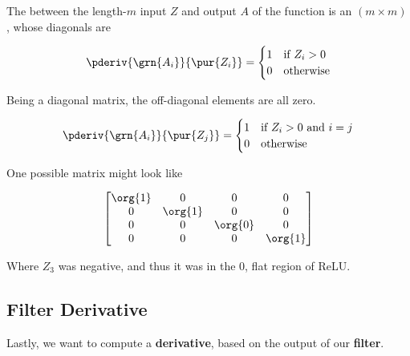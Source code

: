         \begin{kequation}
            The  between the length-$m$ input $Z$ and output $A$ of the  function is an $(m \times m)$ , whose diagonals are

            \begin{equation*}
                \pderiv { \grn{A_i} }{ \pur{Z_i} } = \begin{cases}
                    1 & \text{if } Z_i>0 \\
                    0 & \text{otherwise}
                \end{cases}
            \end{equation*}

            \subsecdiv

            Being a diagonal matrix, the off-diagonal elements are all zero.

            \begin{equation*}
                \pderiv { \grn{A_i} }{ \pur{Z_j} } = \begin{cases}
                    1 & \text{if } Z_i>0 \text{ and } i=j\\
                    0 & \text{otherwise}
                \end{cases}
            \end{equation*}
        \end{kequation}

        \miniex One possible matrix might look like

        \begin{equation}
            \begin{bmatrix}
                \org{1} & 0 & 0 & 0\\
                0 & \org{1} & 0 & 0 \\
                0 & 0 & \org{0} & 0 \\
                0 & 0 & 0 & \org{1} 
            \end{bmatrix}
        \end{equation}

        Where $Z_3$ was negative, and thus it was in the 0, flat region of ReLU.

    \pagebreak

        \subsection{Filter Derivative}

        Lastly, we want to compute a \textbf{derivative}, based on the output of our \textbf{filter}.

